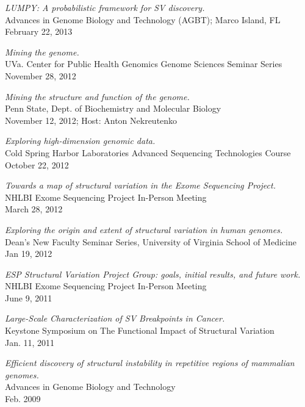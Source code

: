 \documentclass[margin,line]{cv}
\begin{document}
\begin{resume}
    \textit{LUMPY: A probabilistic framework for SV discovery.} \\
    Advances in Genome Biology and Technology (AGBT); Marco Island, FL \\
    February 22, 2013

    \textit{Mining the genome.} \\
    UVa. Center for Public Health Genomics Genome Sciences Seminar Series \\
    November 28, 2012
    
    \textit{Mining the structure and function of the genome.} \\
    Penn State, Dept. of Biochemistry and Molecular Biology \\
    November 12, 2012; Host: Anton Nekreutenko
    
    \textit{Exploring high-dimension genomic data.} \\
    Cold Spring Harbor Laboratories Advanced Sequencing Technologies Course \\
    October 22, 2012
    
    \textit{Towards a map of structural variation in the Exome Sequencing Project.} \\
    NHLBI Exome Sequencing Project In-Person Meeting \\
    March 28, 2012

    \vspace{-2mm}
    \textit{Exploring the origin and extent of structural variation in human genomes.} \\
    Dean’s New Faculty Seminar Series, University of Virginia School of Medicine \\
    Jan 19, 2012

    \vspace{-2mm}
    \textit{ESP Structural Variation Project Group: goals, initial results, and future work.} \\
    NHLBI Exome Sequencing Project In-Person Meeting \\
    June 9, 2011
    
    \vspace{-2mm}
    \textit{Large-Scale Characterization of SV Breakpoints in Cancer.} \\
    Keystone Symposium on The Functional Impact of Structural Variation \\
    Jan. 11, 2011

    \vspace{-2mm}
    \textit{Efficient discovery of structural instability in repetitive regions of mammalian genomes.} \\
    Advances in Genome Biology and Technology \\
    Feb. 2009


\end{resume}
\end{document}

